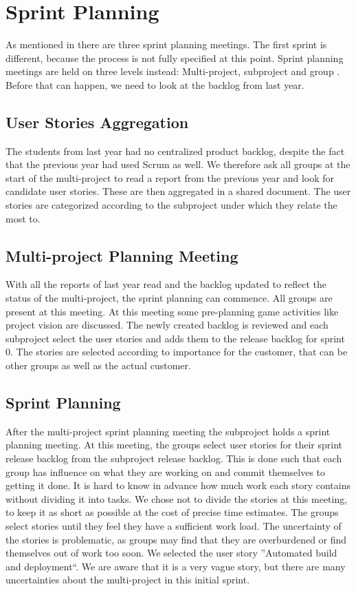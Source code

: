 \chapter{Sprint Planning}\label{chap:sprint1_planning}
As mentioned in  there are three sprint planning meetings. The first sprint is different, because the process is not fully specified at this point. Sprint planning meetings are held on three levels instead: Multi-project, subproject and group . Before that can happen, we need to look at the backlog from last year.

\section{User Stories Aggregation}
The students from last year had no centralized product backlog, despite the fact that the previous year had used Scrum as well. We therefore ask all groups at the start of the multi-project to read a report from the previous year and look for candidate user stories. These are then aggregated in a shared document. The user stories are categorized according to the subproject under which they relate the most to.

\section{Multi-project Planning Meeting}
With all the reports of last year read and the backlog updated to reflect the status of the multi-project, the sprint planning can commence. All groups are present at this meeting. At this meeting some pre-planning game activities like project vision are discussed. The newly created backlog is reviewed and each subproject select the user stories and adds them to the release backlog for sprint 0. The stories are selected according to importance for the customer, that can be other groups as well as the actual customer.

\section{\bd Sprint Planning}
After the multi-project sprint planning meeting the \bd subproject holds a sprint planning meeting. At this meeting, the groups select user stories for their sprint release backlog from the \bd subproject release backlog. This is done such that each group has influence on what they are working on and commit themselves to getting it done. It is hard to know in advance how much work each story contains without dividing it into tasks. We chose not to divide the stories at this meeting, to keep it as short as possible at the cost of precise time estimates. The groups select stories until they feel they have a sufficient work load. The uncertainty of the stories is problematic, as groups may find that they are overburdened or find themselves out of work too soon. We selected the user story ''Automated build and deployment``. We are aware that it is a very vague story, but there are many uncertainties about the multi-project in this initial sprint.

